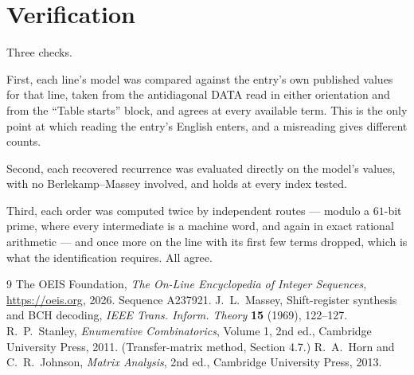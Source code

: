 \documentclass[11pt,a4paper]{article}
\theoremstyle{plain}
\theoremstyle{definition}
\begin{document}
\section{Verification}

Three checks.

First, each line's model was compared against the entry's own published values for that line,
taken from the antidiagonal DATA read in either orientation and from the ``Table starts''
block, and agrees at every available term. This is the only point at which reading the entry's
English enters, and a misreading gives different counts.

Second, each recovered recurrence was evaluated directly on the model's values, with no
Berlekamp--Massey involved, and holds at every index tested.

Third, each order was computed twice by independent routes --- modulo a $61$-bit prime, where
every intermediate is a machine word, and again in exact rational arithmetic --- and once more
on the line with its first few terms dropped, which is what the identification requires. All
agree.

\begin{thebibliography}{9}
 The OEIS Foundation, \emph{The On-Line Encyclopedia of Integer
Sequences}, \url{https://oeis.org}, 2026. Sequence A237921.
 J.~L.~Massey, Shift-register synthesis and BCH decoding, \emph{IEEE
Trans. Inform. Theory} \textbf{15} (1969), 122--127.
 R.~P.~Stanley, \emph{Enumerative Combinatorics}, Volume 1, 2nd ed.,
Cambridge University Press, 2011. (Transfer-matrix method, Section 4.7.)
 R.~A.~Horn and C.~R.~Johnson, \emph{Matrix Analysis}, 2nd ed., Cambridge
University Press, 2013.
\end{thebibliography}
\end{document}

